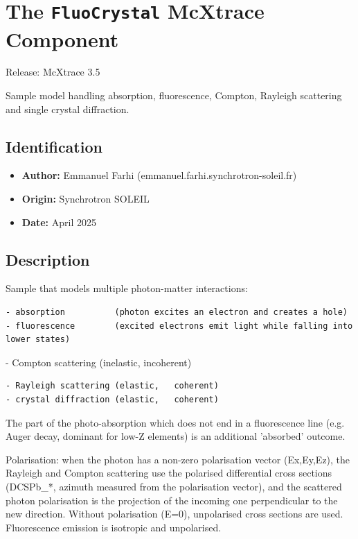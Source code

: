 \section{The \texttt{FluoCrystal} McXtrace Component}
Release:    McXtrace 3.5

Sample model handling absorption, fluorescence, Compton, Rayleigh scattering and single crystal diffraction.

\subsection*{Identification}
\begin{itemize}
  \item \textbf{Author:} Emmanuel Farhi (emmanuel.farhi.synchrotron-soleil.fr)
  \item \textbf{Origin:} Synchrotron SOLEIL
  \item \textbf{Date:} April 2025
\end{itemize}

\subsection*{Description}
Sample that models multiple photon-matter interactions:

\begin{verbatim}
- absorption          (photon excites an electron and creates a hole)
- fluorescence        (excited electrons emit light while falling into lower states)
\end{verbatim}

- Compton scattering (inelastic, incoherent)

\begin{verbatim}
- Rayleigh scattering (elastic,   coherent)
- crystal diffraction (elastic,   coherent)
\end{verbatim}

The part of the photo-absorption which does not end in a fluorescence line (e.g. Auger decay, dominant for low-Z elements) is an additional 'absorbed' outcome.

Polarisation: when the photon has a non-zero polarisation vector (Ex,Ey,Ez), the Rayleigh and Compton scattering use the polarised differential cross sections (DCSPb\_*, azimuth measured from the polarisation vector), and the scattered photon polarisation is the projection of the incoming one perpendicular to the new direction. Without polarisation (E=0), unpolarised cross sections are used. Fluorescence emission is isotropic and unpolarised.

